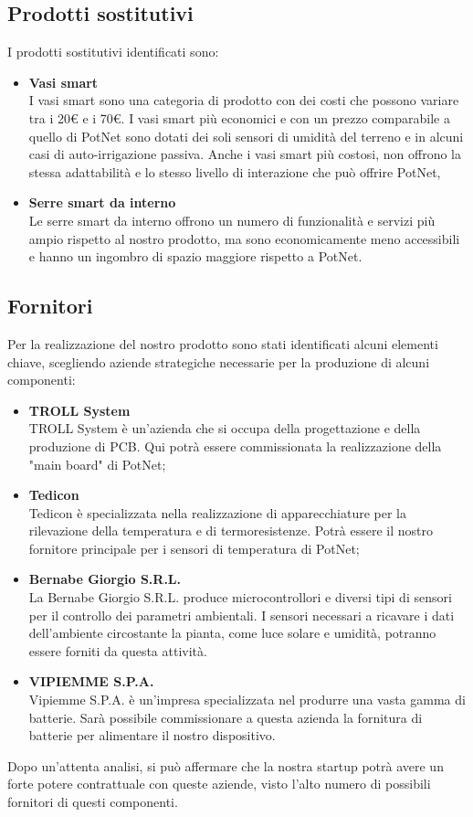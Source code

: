 \subsection{Prodotti sostitutivi}
I prodotti sostitutivi identificati sono:
\begin{itemize}
	\item \textbf{Vasi smart}\\
	I vasi smart sono una categoria di prodotto con dei costi che possono variare tra i 20€ e i 70€. I vasi smart più economici e con un prezzo comparabile a quello di PotNet sono dotati dei soli sensori di umidità del terreno e in alcuni casi di auto-irrigazione passiva. Anche i vasi smart più costosi, non offrono la stessa adattabilità e lo stesso livello di interazione che può offrire PotNet,
	\item \textbf{Serre smart da interno}\\
	Le serre smart da interno offrono un numero di funzionalità e servizi più ampio rispetto al nostro prodotto, ma sono economicamente meno accessibili e hanno un ingombro di spazio maggiore rispetto a PotNet.
\end{itemize}

\subsection{Fornitori}
Per la realizzazione del nostro prodotto sono stati identificati alcuni elementi chiave, scegliendo aziende strategiche necessarie per la produzione di alcuni componenti:
\begin{itemize}
	\item \textbf{TROLL System}\\
	TROLL System è un’azienda che si occupa della progettazione e della produzione di PCB. Qui potrà essere commissionata la realizzazione della "main board" di PotNet;
	
	\item \textbf{Tedicon}\\
	Tedicon è specializzata nella realizzazione di apparecchiature per la rilevazione della temperatura e di termoresistenze. Potrà essere il nostro fornitore principale per i sensori di temperatura di PotNet;
	
	\item \textbf{Bernabe Giorgio S.R.L.}\\
	La Bernabe Giorgio S.R.L. produce microcontrollori e diversi tipi di sensori per il controllo dei parametri ambientali. I sensori necessari a ricavare i dati dell’ambiente circostante la pianta, come luce solare e umidità, potranno essere forniti da questa attività.
	
	\item \textbf{VIPIEMME S.P.A.}\\
	Vipiemme S.P.A. è un’impresa specializzata nel produrre una vasta gamma di batterie. Sarà possibile commissionare a questa azienda la fornitura di batterie per alimentare il nostro dispositivo.
\end{itemize}

Dopo un'attenta analisi, si può affermare che la nostra startup potrà avere un forte potere contrattuale con queste aziende, visto l'alto numero di possibili fornitori di questi componenti.